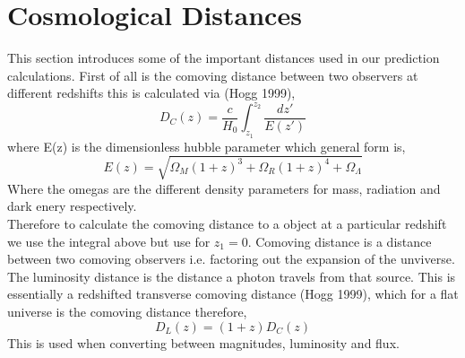 \documentclass{article}
\begin{document}
\section{Cosmological Distances}
This section introduces some of the important distances used in our prediction calculations. First of all is the comoving distance between two observers at different redshifts this is calculated via (Hogg 1999),
\begin{equation}
D_{C}(z)=\frac{c}{H_{0}}\int^{z_{2}}_{z_{1}}\frac{dz'}{E(z')}
\end{equation}
where E(z) is the dimensionless hubble parameter which general form is,
\begin{equation}
E(z)=\sqrt{\Omega_{M}(1+z)^{3}+\Omega_{R}(1+z)^{4}+\Omega_{\Lambda}}
\end{equation}
\indent Where the omegas are the different density parameters for mass, radiation and dark enery respectively.\\
Therefore to calculate the comoving distance to a object at a particular redshift we use the integral above but use for $z_{1}=0$. Comoving distance is a distance between two comoving observers i.e. factoring out the expansion of the unviverse.\\
\indent The luminosity distance is the distance a photon travels from that source. This is essentially a redshifted transverse comoving distance (Hogg 1999), which for a flat universe is the comoving distance therefore,
\begin{equation}
D_{L}(z)=(1+z)D_{C}(z)
\end{equation}
This is used when converting between magnitudes, luminosity and flux.\\
\end{document}
